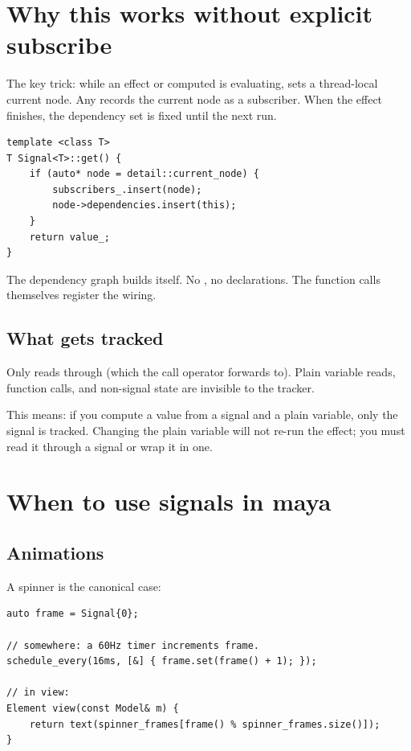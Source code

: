 \section{Why this works without explicit subscribe}

The key trick: while an effect or computed is evaluating,
\maya{} sets a thread-local current node. Any 
records the current node as a subscriber. When the effect
finishes, the dependency set is fixed until the next run.

\begin{lstlisting}
template <class T>
T Signal<T>::get() {
    if (auto* node = detail::current_node) {
        subscribers_.insert(node);
        node->dependencies.insert(this);
    }
    return value_;
}
\end{lstlisting}

The dependency graph builds itself. No ,
no  declarations. The function calls themselves
register the wiring.

\subsection*{What gets tracked}

Only reads through  (which the call operator
forwards to). Plain variable reads, function calls, and
non-signal state are invisible to the tracker.

This means: if you compute a value from a signal and a plain
variable, only the signal is tracked. Changing the plain variable
will not re-run the effect; you must read it through a signal
or wrap it in one.

\section{When to use signals in maya}

\subsection*{Animations}

A spinner is the canonical case:

\begin{lstlisting}
auto frame = Signal{0};

// somewhere: a 60Hz timer increments frame.
schedule_every(16ms, [&] { frame.set(frame() + 1); });

// in view:
Element view(const Model& m) {
    return text(spinner_frames[frame() % spinner_frames.size()]);
}
\end{lstlisting}


